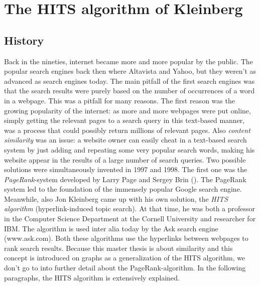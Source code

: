 \documentclass[a4paper,11pt]{report}
\begin{document}
\section{The HITS algorithm of Kleinberg}
\subsection{History}
Back in the nineties, internet became more and more popular by the public. The popular search 
engines back then where Altavista and Yahoo, but they weren't as advanced as 
search engines today. The main pitfall of the first search engines was that the search results 
were purely based on the number of occurrences of a word in a webpage. This was 
a pitfall for many reasons. The first reason was the growing popularity of the 
internet: as more and more webpages were put online, simply getting the relevant 
pages to a search query in this text-based manner, was a process that could possibly return millions 
of relevant pages. Also \emph{content similarity} was an issue: a website owner 
can easily cheat in a text-based search system by just adding and repeating some 
very popular search words, making his website appear in the results of a large 
number of search queries.
Two possible solutions were simultaneously invented in 1997 and 1998. The first 
one was the
\textit{PageRank}-system developed by Larry Page and Sergey 
Brin (\cite{page}). The PageRank system led to the foundation of the immensely popular Google 
search engine. Meanwhile, also Jon Kleinberg came up with his own solution, the\textit{ HITS algorithm} (hyperlink-induced topic search). At that time,
he was both a professor in the Computer Science Department at the Cornell University and researcher for IBM. The algorithm is 
used inter alia today by the Ask search engine (www.ask.com).
Both these algorithms use the hyperlinks between webpages to rank search 
results. 
Because this master thesis is about similarity and this concept is 
introduced on graphs as a generalization of the HITS algorithm, we don't go to into 
further detail about the PageRank-algorithm. In the following paragraphs, the 
HITS algorithm is extensively explained.
\end{document}
